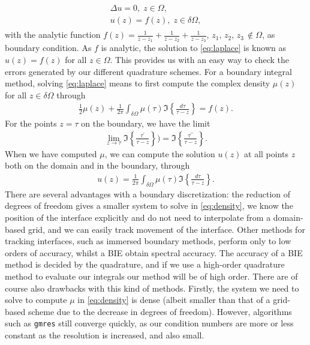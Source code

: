 \documentclass[a4paper,10pt]{article}
\begin{document}
\begin{align}
	\begin{split}
		\Delta u = 0, \; z\in\Omega, \\
		u(z) = f(z), \; z\in\delta\Omega,  
	\end{split}
	\label{eq:laplace}
\end{align}
with the analytic function $f(z)=\frac{1}{z-z_1}+\frac{1}{z-z_2} + \frac{1}{z-z_3}$, $z_1,\,z_2,\,z_3\,\notin\Omega$, as boundary condition. As $f$ is analytic, the solution to \eqref{eq:laplace} is known as $u(z)=f(z)$ for all $z\in\Omega$. This provides us with an easy way to check the errors generated by our different quadrature schemes. For a boundary integral method, solving \eqref{eq:laplace} means to first compute the complex density $\mu(z)$ for all $z\in\delta\Omega$ through
\begin{align}
	\frac{1}{2}\mu(z) + \frac{1}{2\pi}\int_{\delta\Omega} \mu(\tau) \Im\left\{ \frac{d\tau}{\tau-z}\right\} = f(z).
	\label{eq:density}
\end{align}
For the points $z = \tau$ on the boundary, we have the limit 
\begin{align*}
\lim_{z\rightarrow\tau} \Im\left\{ \frac{\tau^\prime}{\tau-z}\right\} ) = \Im\left\{ \frac{\tau^{\prime\prime}}{\tau-z} \right\}.
\end{align*}
When we have computed $\mu$, we can compute the solution $u(z)$ at all points $z$ both on the domain and in the boundary, through
\begin{align}
	u(z) = \frac{1}{2\pi} \int_{\delta\Omega} \mu(\tau) \Im\left\{ \frac{d\tau}{\tau-z} \right\}.
\label{eq:ulapl}
\end{align}
There are several advantages with a boundary discretization: the reduction of degrees of freedom gives a smaller system to solve in \eqref{eq:density}, we know the position of the interface explicitly and do not need to interpolate from a domain-based grid, and we can easily track movement of the interface. Other methods for tracking interfaces, such as immersed boundary methods, perform only to low orders of accuracy, whilst a BIE obtain spectral accuracy. The accuracy of a BIE method is decided by the quadrature, and if we use  a high-order quadrature method to evaluate our integrals our method will be of high order. There are of course also drawbacks with this kind of methods. Firstly, the system we need to solve to compute $\mu$ in \eqref{eq:density} is dense (albeit smaller than that of a grid-based scheme due to the decrease in degrees of freedom). However, algorithms such as \texttt{gmres} still converge quickly, as our condition numbers are more or less constant as the resolution is increased, and also small. 
\end{document}
